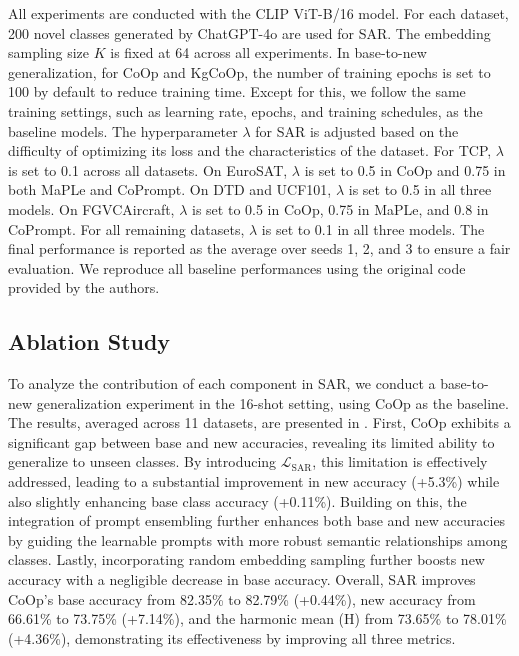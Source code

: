 All experiments are conducted with the CLIP ViT-B/16 model. For each dataset, 200 novel classes generated by ChatGPT-4o are used for SAR. The embedding sampling size $K$ is fixed at 64 across all experiments. In base-to-new generalization, for CoOp and KgCoOp, the number of training epochs is set to 100 by default to reduce training time. Except for this, we follow the same training settings, such as learning rate, epochs, and training schedules, as the baseline models. The hyperparameter $\lambda$ for SAR is adjusted based on the difficulty of optimizing its loss and the characteristics of the dataset. For TCP, $\lambda$ is set to 0.1 across all datasets. On EuroSAT, $\lambda$ is set to 0.5 in CoOp and 0.75 in both MaPLe and CoPrompt. On DTD and UCF101, $\lambda$ is set to 0.5 in all three models. On FGVCAircraft, $\lambda$ is set to 0.5 in CoOp, 0.75 in MaPLe, and 0.8 in CoPrompt. For all remaining datasets, $\lambda$ is set to 0.1 in all three models. The final performance is reported as the average over seeds 1, 2, and 3 to ensure a fair evaluation. We reproduce all baseline performances using the original code provided by the authors.

\subsection{Ablation Study}  
To analyze the contribution of each component in SAR, we conduct a base-to-new generalization experiment in the 16-shot setting, using CoOp as the baseline. The results, averaged across 11 datasets, are presented in . First, CoOp exhibits a significant gap between base and new accuracies, revealing its limited ability to generalize to unseen classes. By introducing $\mathcal{L}_{\text{SAR}}$, this limitation is effectively addressed, leading to a substantial improvement in new accuracy (+5.3\%) while also slightly enhancing base class accuracy (+0.11\%). Building on this, the integration of prompt ensembling further enhances both base and new accuracies by guiding the learnable prompts with more robust semantic relationships among classes. Lastly, incorporating random embedding sampling further boosts new accuracy with a negligible decrease in base accuracy. Overall, SAR improves CoOp's base accuracy from 82.35\% to 82.79\% (+0.44\%), new accuracy from 66.61\% to 73.75\% (+7.14\%), and the harmonic mean (H) from 73.65\% to 78.01\% (+4.36\%), demonstrating its effectiveness by improving all three metrics.

